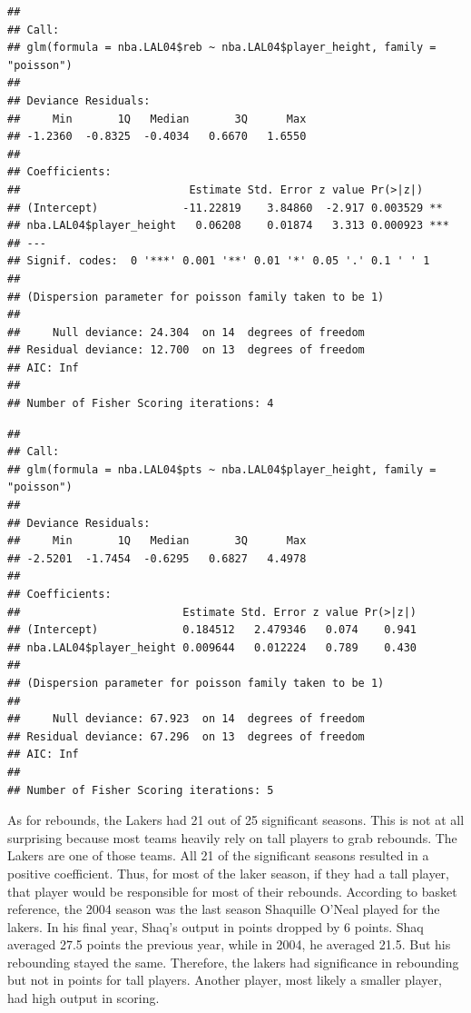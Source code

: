\documentclass[11pt,letterpaper]{amsart}
\begin{document}
\begin{verbatim}
## 
## Call:
## glm(formula = nba.LAL04$reb ~ nba.LAL04$player_height, family = "poisson")
## 
## Deviance Residuals: 
##     Min       1Q   Median       3Q      Max  
## -1.2360  -0.8325  -0.4034   0.6670   1.6550  
## 
## Coefficients:
##                          Estimate Std. Error z value Pr(>|z|)    
## (Intercept)             -11.22819    3.84860  -2.917 0.003529 ** 
## nba.LAL04$player_height   0.06208    0.01874   3.313 0.000923 ***
## ---
## Signif. codes:  0 '***' 0.001 '**' 0.01 '*' 0.05 '.' 0.1 ' ' 1
## 
## (Dispersion parameter for poisson family taken to be 1)
## 
##     Null deviance: 24.304  on 14  degrees of freedom
## Residual deviance: 12.700  on 13  degrees of freedom
## AIC: Inf
## 
## Number of Fisher Scoring iterations: 4
\end{verbatim}


\begin{verbatim}
## 
## Call:
## glm(formula = nba.LAL04$pts ~ nba.LAL04$player_height, family = "poisson")
## 
## Deviance Residuals: 
##     Min       1Q   Median       3Q      Max  
## -2.5201  -1.7454  -0.6295   0.6827   4.4978  
## 
## Coefficients:
##                         Estimate Std. Error z value Pr(>|z|)
## (Intercept)             0.184512   2.479346   0.074    0.941
## nba.LAL04$player_height 0.009644   0.012224   0.789    0.430
## 
## (Dispersion parameter for poisson family taken to be 1)
## 
##     Null deviance: 67.923  on 14  degrees of freedom
## Residual deviance: 67.296  on 13  degrees of freedom
## AIC: Inf
## 
## Number of Fisher Scoring iterations: 5
\end{verbatim} \leavevmode
\indent As for rebounds, the Lakers had 21 out of 25 significant seasons. This is not at all surprising because most teams heavily rely on tall players to grab rebounds. The Lakers are one of those teams. All 21 of the significant seasons resulted in a positive coefficient. Thus, for most of the laker season, if they had a tall player, that player would be responsible for most of their rebounds. According to basket reference, the 2004 season was the last season Shaquille O’Neal played for the lakers. In his final year, Shaq’s output in points dropped by 6 points. Shaq averaged 27.5 points the previous year, while in 2004, he averaged 21.5. But his rebounding stayed the same. Therefore, the lakers had significance in rebounding but not in points for tall players. Another player, most likely a smaller player, had high output in scoring.\\
\cite{6}\\
\end{document}
